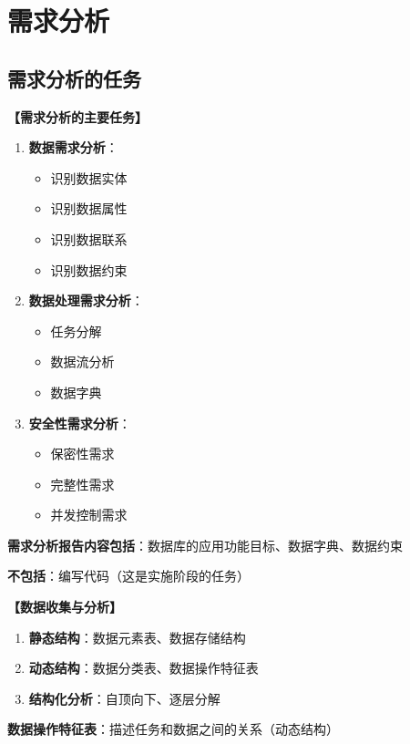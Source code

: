 \documentclass[12pt, a4paper]{article}
\newenvironment{bluebox}[1]{%
  \begin{trivlist}
  \item[\hskip\labelsep \textbf{#1}]
  \setlength{\parskip}{0.5ex}
  \setlength{\itemsep}{0.5ex}
}{%
  \end{trivlist}
  }
\begin{document}
\section{需求分析}

\subsection{需求分析的任务}

\begin{bluebox}{需求分析内容}
	\textbf{【需求分析的主要任务】}

	\begin{enumerate}[leftmargin=*, label=\textbf{\arabic*.}]
		\item \textbf{数据需求分析}：
		      \begin{itemize}[nosep]
			      \item 识别数据实体
			      \item 识别数据属性
			      \item 识别数据联系
			      \item 识别数据约束
		      \end{itemize}

		\item \textbf{数据处理需求分析}：
		      \begin{itemize}[nosep]
			      \item 任务分解
			      \item 数据流分析
			      \item 数据字典
		      \end{itemize}

		\item \textbf{安全性需求分析}：
		      \begin{itemize}[nosep]
			      \item 保密性需求
			      \item 完整性需求
			      \item 并发控制需求
		      \end{itemize}
	\end{enumerate}

	\textbf{需求分析报告内容包括}：数据库的应用功能目标、数据字典、数据约束

	\textbf{不包括}：编写代码（这是实施阶段的任务）
\end{bluebox}

\begin{bluebox}{数据收集方法}
	\textbf{【数据收集与分析】}

	\begin{enumerate}[leftmargin=*, label=\textbf{\arabic*.}]
		\item \textbf{静态结构}：数据元素表、数据存储结构
		\item \textbf{动态结构}：数据分类表、数据操作特征表
		\item \textbf{结构化分析}：自顶向下、逐层分解
	\end{enumerate}

	\textbf{数据操作特征表}：描述任务和数据之间的关系（动态结构）
\end{bluebox}
\end{document}
